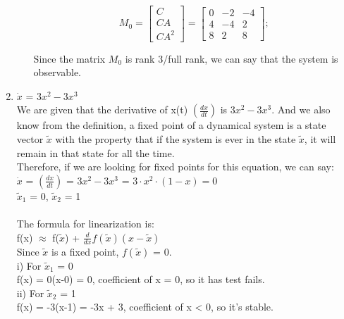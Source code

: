 \documentclass[12pt,a4paper, margin=1in]{article}
\begin{document}
\begin{enumerate}
\begin{enumerate}
            
            \begin{equation*}
            M_0 =
            \begin{bmatrix}
                C\\
                CA\\
                CA^2
            \end{bmatrix}
            = 
            \begin{bmatrix}
                0 & -2 & -4\\
                4 & -4 & 2\\
                8 & 2 & 8
            \end{bmatrix}; 
            \end{equation*}

            Since the matrix $M_0$ is rank 3/full rank, we can say that the system is observable.
            
        \end{enumerate}
        
        
    \item %
        $\dot{x}$ = $3x^2-3x^3$\\
        We are given that the derivative of x(t) $(\frac{dx}{dt})$ is $3x^2-3x^3$. And we also know from the definition, a fixed point of a dynamical system is a state vector $\tilde{x}$ with the property that if the system is ever in the state $\tilde{x}$, it will remain in that state for all the time.\\
        Therefore, if we are looking for fixed points for this equation, we can say:\\
        $\dot{x}$ = $(\frac{dx}{dt})$ = $3x^2-3x^3$ = $3\cdot x^2 \cdot (1-x) = 0$\\
        $\tilde{x}_1$ = 0, $\tilde{x}_2$ = 1\\\\
        The formula for linearization is:\\
        f(x) $\approx$ f($\tilde{x}$) + $\frac{d}{dx}f(\tilde{x})(x-\tilde{x})$\\
        Since $\tilde{x}$ is a fixed point, $f(\tilde{x})$ = 0.\\

        i) For $\tilde{x}_1$ = 0\\
        f(x) = 0(x-0) = 0, coefficient of x = 0, so it has test fails.\\
        
        ii) For $\tilde{x}_2$ = 1\\
        f(x) = -3(x-1) = -3x + 3, coefficient of x < 0, so it's stable.\\
        


\end{enumerate}
\end{document}
